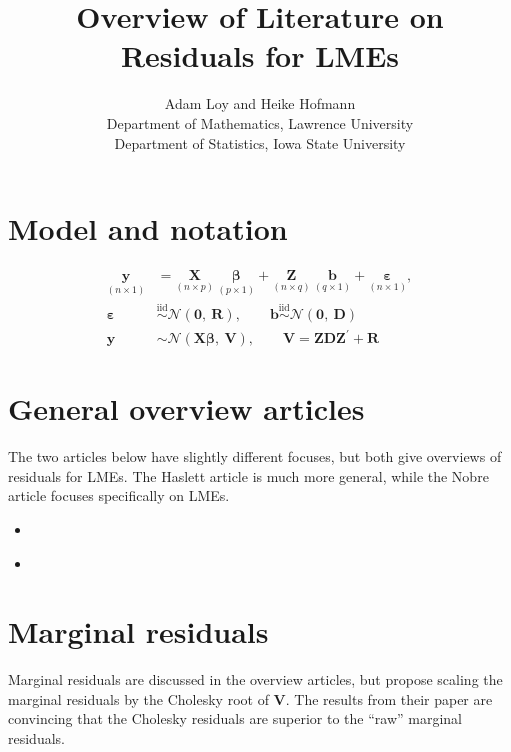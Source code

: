 \documentclass[11pt]{article} %
\begin{document}
\title{Overview of Literature on Residuals for LMEs}
\author{
	Adam Loy and Heike Hofmann\\
	Department of Mathematics,
	Lawrence University\\
	Department of Statistics,
	Iowa State University
}
\date{}
\maketitle

\section{Model and notation}

\begin{align}\label{eq:lmd}
	\underset{(n \times 1)}{\bm{y}} &= \underset{(n \times p)}{\bm{X}} \ \underset{(p \times 1)}{\bm{\beta}} + \underset{(n \times q)}{\bm{Z}} \ \underset{(q \times 1)}{\bm{b}} + \underset{(n \times 1)}{\bm{\varepsilon}},\\
	\bm{\varepsilon} & \overset{\text{iid}}{\sim} \mathcal{N}(\bm{0}, \ \bm{R}), \qquad \bm{b} \overset{\text{iid}}{\sim} \mathcal{N}(\bm{0},\ \bm{D}) \nonumber \\
	\bm{y} & \sim \mathcal{N}(\bm{X\beta},\ \bm{V}), \qquad \bm{V} = \bm{ZDZ}^\prime + \bm{R}
\end{align}

\section{General overview articles}

The two articles below have slightly different focuses, but both give overviews of residuals for LMEs. The Haslett article is much more general, while the Nobre article focuses specifically on LMEs.

\begin{itemize}
\item \cite{Haslett:2007vv}
\item \cite{Nobre:2007ej}
\end{itemize}


\section{Marginal residuals}

Marginal residuals are discussed in the overview articles, but  \cite{Houseman:2004gq} propose scaling the marginal residuals by the Cholesky root of $\bm{V}$. The results from their paper are convincing that the Cholesky residuals are superior to the ``raw'' marginal residuals.
\end{document}
